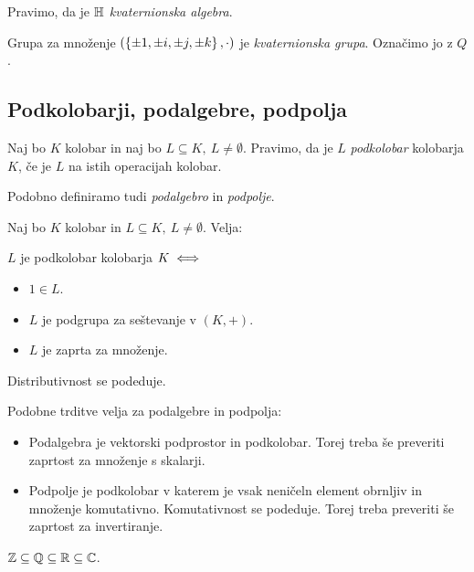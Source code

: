 Pravimo, da je $\mathbb{H}$ \emph{kvaternionska algebra}. 

Grupa za množenje $(\left\{\pm 1, \pm i, \pm j, \pm k\right\}, \cdot)$ je \emph{kvaternionska grupa}. Označimo jo z $Q$.

\subsection{Podkolobarji, podalgebre, podpolja}
\begin{definicija}
    Naj bo $K$ kolobar in naj bo $L \subseteq K, \ L \neq \emptyset$. Pravimo, da je $L$ \emph{podkolobar} kolobarja $K$, če je $L$ na istih operacijah kolobar.
\end{definicija}

\begin{opomba}
    Podobno definiramo tudi \emph{podalgebro} in \emph{podpolje}.
\end{opomba}

\begin{trditev}
    Naj bo $K$ kolobar in $L \subseteq K, \ L \neq \emptyset$. Velja: 

    $L$ je podkolobar kolobarja $K \iff$
    \begin{itemize}
        \item $1 \in L$.
        \item $L$ je podgrupa za seštevanje v $(K,+)$.
        \item $L$ je zaprta za množenje.
    \end{itemize}
\end{trditev}

\begin{opomba}
    Distributivnost se podeduje.
\end{opomba}

\begin{opomba}
    Podobne trditve velja za podalgebre in podpolja:
    \begin{itemize}
        \item Podalgebra je vektorski podprostor in podkolobar. Torej treba še preveriti zaprtost za množenje s skalarji.
        \item Podpolje je podkolobar v katerem je vsak neničeln element obrnljiv in množenje komutativno. Komutativnost se podeduje. Torej treba preveriti še zaprtost za invertiranje.
    \end{itemize}
\end{opomba}

\begin{primer}
    $\mathbb{Z} \subseteq \mathbb{Q} \subseteq \mathbb{R} \subseteq \mathbb{C}$.
\end{primer}

